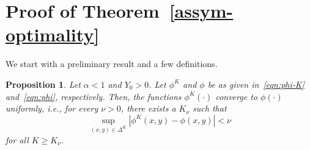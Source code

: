 \documentclass[10pt,journal,letterpaper]{IEEEtran}
\newtheorem{proposition}{Proposition}[section]
\begin{document}
\section{Proof of Theorem~\ref{assym-optimality}}
\label{proof-assym-optimality}
We start with a preliminary result and a few definitions.
\begin{proposition}
\label{prop-uni-conv} Let $\alpha < 1$ and $Y_0 > 0$. Let $\phi^K$
and $\phi$ be as given in~\eqref{eqn:phi-K} and~\eqref{eqn:phi},
respectively. Then, the functions $\phi^K(\cdot)$ converge to
$\phi(\cdot)$ uniformly, i.e., for every $\nu > 0$, there exists a
$K_{\nu}$ such that
\begin{equation*}
\sup_{(x,y) \in \Delta^K} |\phi^K(x,y) - \phi(x,y)| < \nu
\end{equation*}
for all $K \geq K_{\nu}$.
\end{proposition}
\end{document}

